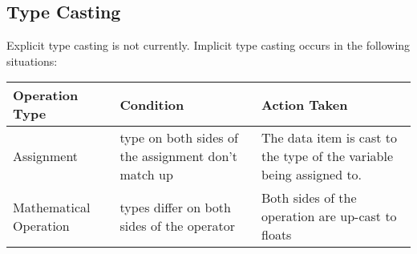 \documentclass{standalone}
\begin{document}
		\subsection{Type Casting}
			Explicit type casting is not currently.
			Implicit type casting occurs in the following situations:\\
			\begin{tabular}{| l | p{5cm} | p{5cm}|}
				\hline
				Operation Type & Condition & Action Taken \\ 
				\hline
				Assignment	& type on both sides of the assignment don't match up & The data item is cast to the type of the variable being assigned to. \\ 
				\hline
				Mathematical Operation & types differ on both sides of the operator & Both sides of the operation are up-cast to floats\\
				\hline
			\end{tabular}
\end{document}
